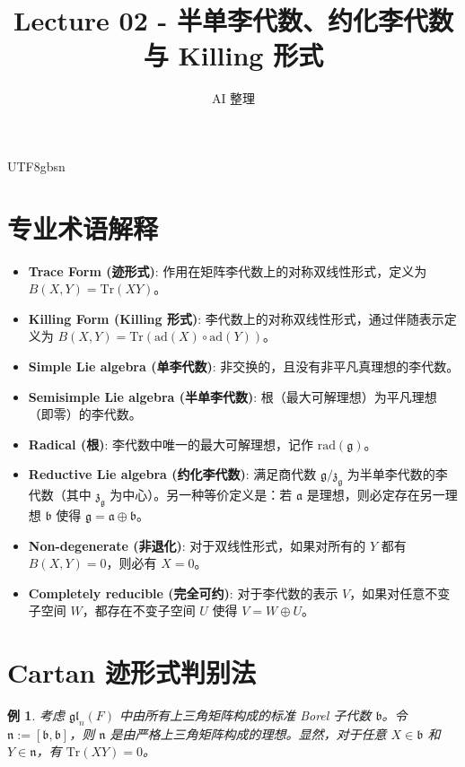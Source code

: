 \documentclass[11pt]{article}
\newtheorem{example}[theorem]{例}
\begin{document}
\begin{CJK*}{UTF8}{gbsn}

\title{Lecture 02 - 半单李代数、约化李代数与 Killing 形式}
\author{AI 整理}
\date{}
\maketitle

\section*{专业术语解释}
\begin{itemize}
    \item \textbf{Trace Form (迹形式)}: 作用在矩阵李代数上的对称双线性形式，定义为 $B(X, Y) = \mathrm{Tr}(XY)$。
    \item \textbf{Killing Form (Killing 形式)}: 李代数上的对称双线性形式，通过伴随表示定义为 $B(X, Y) = \mathrm{Tr}(\mathrm{ad}(X) \circ \mathrm{ad}(Y))$。
    \item \textbf{Simple Lie algebra (单李代数)}: 非交换的，且没有非平凡真理想的李代数。
    \item \textbf{Semisimple Lie algebra (半单李代数)}: 根（最大可解理想）为平凡理想（即零）的李代数。
    \item \textbf{Radical (根)}: 李代数中唯一的最大可解理想，记作 $\mathrm{rad}(\mathfrak{g})$。
    \item \textbf{Reductive Lie algebra (约化李代数)}: 满足商代数 $\mathfrak{g}/\mathfrak{z}_{\mathfrak{g}}$ 为半单李代数的李代数（其中 $\mathfrak{z}_{\mathfrak{g}}$ 为中心）。另一种等价定义是：若 $\mathfrak{a}$ 是理想，则必定存在另一理想 $\mathfrak{b}$ 使得 $\mathfrak{g} = \mathfrak{a} \oplus \mathfrak{b}$。
    \item \textbf{Non-degenerate (非退化)}: 对于双线性形式，如果对所有的 $Y$ 都有 $B(X,Y)=0$，则必有 $X=0$。
    \item \textbf{Completely reducible (完全可约)}: 对于李代数的表示 $V$，如果对任意不变子空间 $W$，都存在不变子空间 $U$ 使得 $V = W \oplus U$。
\end{itemize}

\section{Cartan 迹形式判别法}

\begin{example}
考虑 $\mathfrak{gl}_n(F)$ 中由所有上三角矩阵构成的标准 Borel 子代数 $\mathfrak{b}$。令 $\mathfrak{n} := [\mathfrak{b}, \mathfrak{b}]$，则 $\mathfrak{n}$ 是由严格上三角矩阵构成的理想。显然，对于任意 $X \in \mathfrak{b}$ 和 $Y \in \mathfrak{n}$，有 $\mathrm{Tr}(XY) = 0$。
\end{example}


\end{CJK*}
\end{document}
